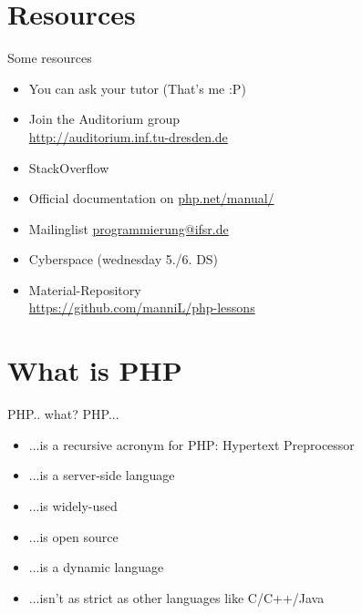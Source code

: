\section{Resources}
\begin{frame}{Some resources}
	\begin{itemize}
		\item You can ask your tutor (That's me :P)
		\item Join the Auditorium group \hfill \\
			\url{http://auditorium.inf.tu-dresden.de}
		\item StackOverflow \hfill \\
		\item Official documentation on \url{php.net/manual/} \pause
        \item Mailinglist \url{programmierung@ifsr.de}
        \item Cyberspace (wednesday 5./6. DS)
		\item Material-Repository \\
			\url{https://github.com/manniL/php-lessons}
	\end{itemize}
\end{frame}

\section{What is PHP}
\begin{frame}{PHP.. what?}
	PHP...
	\begin{itemize}
		\item ...is a recursive acronym for PHP: Hypertext Preprocessor \pause
		\item ...is a server-side language \pause
		\item ...is widely-used \pause
		\item ...is open source \pause
		\item ...is a dynamic language \pause
		\item ...isn't as strict as other languages like C/C++/Java
	\end{itemize}
\end{frame}

